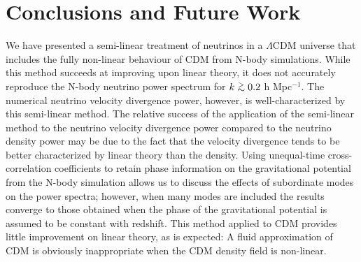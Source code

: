 \documentclass[twocolumn,superscriptaddress,prd]{revtex4}
\def\gtsima{$\; \buildrel > \over \sim \;$}
\def\gsim{\lower.5ex\hbox{\gtsima}}
\begin{document}






\section{Conclusions and Future Work}
\label{sec:Conclusions}

We have presented a
semi-linear treatment of neutrinos in a $\Lambda$CDM
universe that includes the
fully non-linear behaviour of CDM from N-body
simulations.  While this method succeeds at
improving upon linear theory, it does not accurately
reproduce the N-body neutrino power spectrum for
$k\gsim0.2$ h Mpc$^{-1}$.  The
numerical neutrino velocity divergence power, however, is well-characterized by
this semi-linear method.  The relative success of the application of
the semi-linear method to the 
neutrino velocity divergence power compared to the
neutrino density power may be due to the fact that the velocity
divergence tends to be better characterized by linear theory than the density.
Using unequal-time cross-correlation
coefficients to retain phase information on the gravitational potential
from the N-body simulation allows us to discuss the effects of
 subordinate modes on the power spectra; however, when many modes are included
 the results converge to those
obtained when the phase of the gravitational potential is assumed to
be constant with redshift. 
This method applied to CDM 
provides little improvement on linear theory, as is expected: A fluid approximation of CDM is
obviously inappropriate when the CDM density field is non-linear.  
\end{document}
